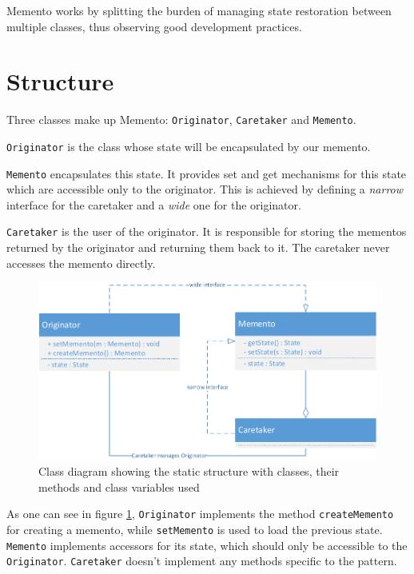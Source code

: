 \documentclass[11pt, a4paper, twoside]{article}
\begin{document}
	 Memento works by splitting the burden of managing state restoration between multiple classes, thus observing good development practices.
	 	
	\section{Structure}
	Three classes make up Memento: \verb|Originator|, \verb|Caretaker| and \verb|Memento|.
	
	\verb|Originator| is the class whose state will be encapsulated by our memento.
	
	\verb|Memento| encapsulates this state. It provides set and get mechanisms for this state which are accessible only to the originator. This is achieved by defining a \emph{narrow} interface for the caretaker and a \emph{wide} one for the originator.
	
	\verb|Caretaker| is the user of the originator. It is responsible for storing the mementos returned by the originator and returning them back to it. The caretaker never accesses the memento directly.
	
	\begin{figure}[htb]
		\begin{center}
			\includegraphics[width=\textwidth]{class_diagram.pdf}
			\caption{Class diagram showing the static structure with classes, their methods and class variables used}
			\label{fig:class}
		\end{center}
	\end{figure}
	
	As one can see in figure \ref{fig:class}, \verb|Originator| implements the method \verb|createMemento| for creating a memento, while \verb|setMemento| is used to load the previous state. \verb|Memento| implements accessors for its state, which should only be accessible to the \verb|Originator|. \verb|Caretaker| doesn't implement any methods specific to the pattern.
	
\end{document}
